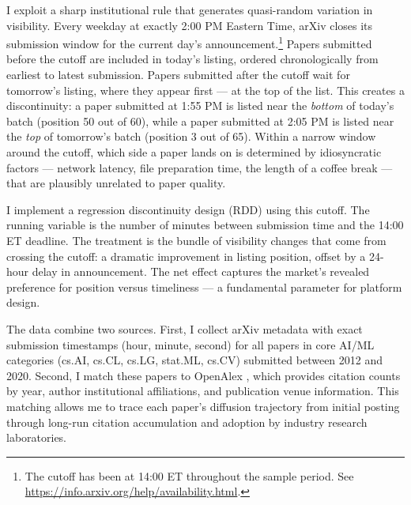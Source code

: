 \documentclass[12pt]{article}
\begin{document}
I exploit a sharp institutional rule that generates quasi-random variation in visibility. Every weekday at exactly 2:00 PM Eastern Time, arXiv closes its submission window for the current day's announcement.\footnote{The cutoff has been at 14:00 ET throughout the sample period. See \url{https://info.arxiv.org/help/availability.html}.} Papers submitted before the cutoff are included in today's listing, ordered chronologically from earliest to latest submission. Papers submitted after the cutoff wait for tomorrow's listing, where they appear first --- at the top of the list. This creates a discontinuity: a paper submitted at 1:55 PM is listed near the \textit{bottom} of today's batch (position 50 out of 60), while a paper submitted at 2:05 PM is listed near the \textit{top} of tomorrow's batch (position 3 out of 65). Within a narrow window around the cutoff, which side a paper lands on is determined by idiosyncratic factors --- network latency, file preparation time, the length of a coffee break --- that are plausibly unrelated to paper quality.

I implement a regression discontinuity design (RDD) using this cutoff. The running variable is the number of minutes between submission time and the 14:00 ET deadline. The treatment is the bundle of visibility changes that come from crossing the cutoff: a dramatic improvement in listing position, offset by a 24-hour delay in announcement. The net effect captures the market's revealed preference for position versus timeliness --- a fundamental parameter for platform design.

The data combine two sources. First, I collect arXiv metadata with exact submission timestamps (hour, minute, second) for all papers in core AI/ML categories (cs.AI, cs.CL, cs.LG, stat.ML, cs.CV) submitted between 2012 and 2020. Second, I match these papers to OpenAlex \citep{priem2022}, which provides citation counts by year, author institutional affiliations, and publication venue information. This matching allows me to trace each paper's diffusion trajectory from initial posting through long-run citation accumulation and adoption by industry research laboratories.
\end{document}
